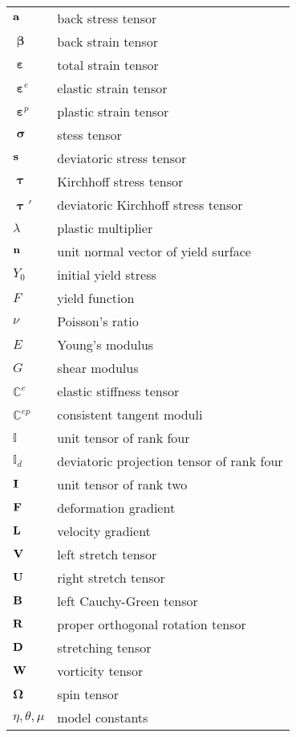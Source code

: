 \renewcommand\arraystretch{1.2}

\begin{table}[!hbp]
  \centering
    \begin{tabular}{p{4cm}p{9.5cm}}
    $\bf{a}$ & back stress tensor \\
    $\bm{\upbeta}$ & back strain tensor \\
    $\bm{\upepsilon}$ & total strain tensor \\
    $\bm{\upepsilon}^e$ & elastic strain tensor \\
    $\bm{\upepsilon}^p$ & plastic strain tensor \\
    $\bm{\upsigma}$ & stess tensor \\
    $\bf{s}$ & deviatoric stress tensor \\
    $\bm{\uptau}$ & Kirchhoff stress tensor \\
    $\bm{\uptau}'$ & deviatoric Kirchhoff stress tensor \\
    $\lambda$ & plastic multiplier \\
    $\bf{n}$ & unit normal vector of yield surface \\
    $Y_0$ & initial yield stress \\
    $F$   & yield function \\
    $\nu$ & Poisson's ratio \\
    $E$   & Young's modulus \\
    $G$   & shear modulus \\
    $\mathbb{C}^{e}$ & elastic stiffness tensor \\
    $\mathbb{C}^{ep}$ & consistent tangent moduli \\
    $\mathbb{I}$ & unit tensor of rank four \\
    $\mathbb{I}_d$ & deviatoric projection tensor of rank four \\
    $\bf{I}$ & unit tensor of rank two \\
    $\bf{F}$ & deformation gradient \\
    $\bf{L}$ & velocity gradient \\
    $\bf{V}$ & left stretch tensor \\
    $\bf{U}$ & right stretch tensor \\
    $\bf{B}$ & left Cauchy-Green tensor \\
    $\bf{R}$ & proper orthogonal rotation tensor \\
    $\bf{D}$ & stretching tensor \\
    $\bf{W}$ & vorticity tensor \\
    $\bm{\Omega}$ & spin tensor \\
    $\eta,\theta,\mu$ & model constants \\
    \end{tabular}%
  \label{Tab:symbols1}%
\end{table}%

